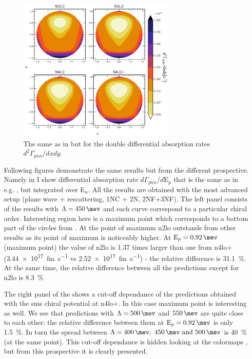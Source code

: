     \begin{figure}[h]
        \begin{center}
        \includegraphics[width=0.7\textwidth]{PlotData/PION/Dalitz_maps/figures/Dalitz_map_pnn_xy_orders.pdf}
        \end{center}
        \caption{The same as in  but for the double differential absorption rates
        $d^2 \Gamma_{pnn}/dxdy$.}
        \label{pion_map_xy_order}
    \end{figure}

    Following figures demonstrate the same results but from the different prospective.
    Namely in  I show differential absorption rate $d\Gamma_{pnn} /d\text{E}_p$
    that is the same as in e.g. , but integrated over E$_n$.
    All the results are obtained with the most advanced setup (plane wave + rescattering, 1NC + 2N, 2NF+3NF).
    The left panel consists of the results with $\Lambda=\SI{450}{\mev}$ and each curve correspond 
    to a particular chiral order. Interesting region here is a maximum point which corresponds
    to a bottom part of the circles from . At the point of maximum
    \gls{n2lo} outstands from other results as its point of maximum is noticeably higher.
    At $\text{E}_p = \SI{0.92}{\mev}$ (maximum point) the value of \gls{n2lo} is
    \num{1.37} times larger than one from \gls{n4lo+} (\SI{3.44e+17}{fm.\s^{-1}}
    vs \SI{2.52e+17}{fm.\s^{-1}}) - the relative difference is \SI{31.1}{\percent}.
    At the same time, the relative difference between all the predictions except for \gls{n2lo}
    is \SI{8.3}{\percent}

    The right panel of the  shows a cut-off dependance of the predictions obtained
    with the \gls{sms} chiral potential at \gls{n4lo+}. In this case maximum point is interesting as well.
    We see that predictions with $\Lambda=\SI{500}{\mev}$ and $\SI{550}{\mev}$ are quite close to each other:
    the relative difference between them at $\text{E}_p = \SI{0.92}{\mev}$ is only \SI{1.5}{\percent}.
    In turn the spread between $\Lambda=\SIlist{400;450;500}{\mev}$ is \SI{40}{\percent} (at the same point).
    This cut-off dependance is hidden looking at the colormaps 
    , but from this prospective it is clearly presented.


